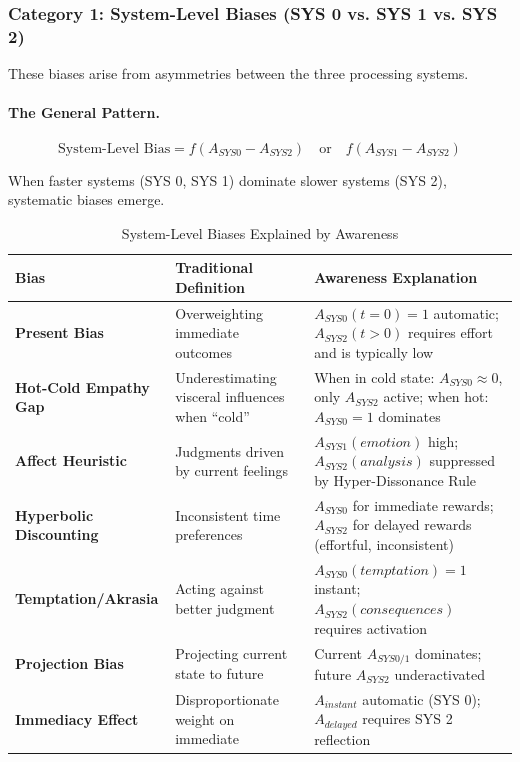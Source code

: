 \subsubsection{Category 1: System-Level Biases (SYS 0 vs. SYS 1 vs. SYS 2)}

These biases arise from asymmetries between the three processing systems.

\paragraph{The General Pattern.}
\begin{equation}
\text{System-Level Bias} = f(A_{SYS0} - A_{SYS2}) \quad \text{or} \quad f(A_{SYS1} - A_{SYS2})
\end{equation}

When faster systems (SYS 0, SYS 1) dominate slower systems (SYS 2), 
systematic biases emerge.

\begin{table}[htbp]
\centering
\caption{System-Level Biases Explained by Awareness}
\label{tab:system-level-biases}
\renewcommand{\arraystretch}{1.4}
\begin{tabular}{@{}lp{4cm}p{6cm}@{}}
\toprule
\textbf{Bias} & \textbf{Traditional Definition} & \textbf{Awareness Explanation} \\
\midrule
\textbf{Present Bias} & 
Overweighting immediate outcomes & 
$A_{SYS0}(t=0) = 1$ automatic; $A_{SYS2}(t>0)$ requires effort and is typically low \\
\midrule
\textbf{Hot-Cold Empathy Gap} & 
Underestimating visceral influences when ``cold'' & 
When in cold state: $A_{SYS0} \approx 0$, only $A_{SYS2}$ active; when hot: $A_{SYS0} = 1$ dominates \\
\midrule
\textbf{Affect Heuristic} & 
Judgments driven by current feelings & 
$A_{SYS1}(emotion)$ high; $A_{SYS2}(analysis)$ suppressed by Hyper-Dissonance Rule \\
\midrule
\textbf{Hyperbolic Discounting} & 
Inconsistent time preferences & 
$A_{SYS0}$ for immediate rewards; $A_{SYS2}$ for delayed rewards (effortful, inconsistent) \\
\midrule
\textbf{Temptation/Akrasia} & 
Acting against better judgment & 
$A_{SYS0}(temptation) = 1$ instant; $A_{SYS2}(consequences)$ requires activation \\
\midrule
\textbf{Projection Bias} & 
Projecting current state to future & 
Current $A_{SYS0/1}$ dominates; future $A_{SYS2}$ underactivated \\
\midrule
\textbf{Immediacy Effect} & 
Disproportionate weight on immediate & 
$A_{instant}$ automatic (SYS 0); $A_{delayed}$ requires SYS 2 reflection \\
\bottomrule
\end{tabular}
\end{table}

